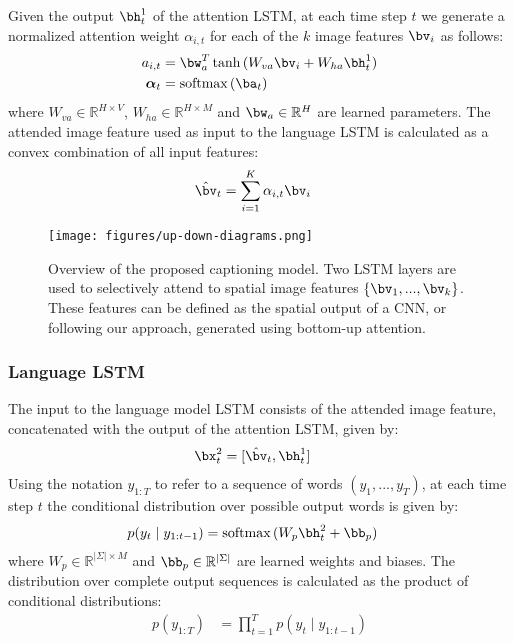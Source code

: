\documentclass[10pt,twocolumn,letterpaper]{article}
\begin{document}
Given the output $\bh_t^1$ of the attention LSTM, at each time step $t$ we generate a normalized attention weight $\alpha_{i,t}$ for each of the $k$ image features $\bv_i$ as follows:
\begin{align}
\label{eqn:att}
a_{i,t} &= \bw_a^T \tanh\,(W_{va}\bv_i + W_{ha}\bh_t^1) \\
\label{eqn:norm}
\boldsymbol{\alpha}_{t} &= \textrm{softmax}\,(\ba_{t})
\end{align}
\noindent
where $W_{va} \in \mathbb{R}^{H\times V}$, $W_{ha} \in \mathbb{R}^{H\times M}$ and $\bw_a \in \mathbb{R}^{H}$ are learned parameters. The attended image feature used as input to the language LSTM is calculated as a convex combination of all input features:
\begin{align}
\label{eqn:attended}
\hat{\bv}_t &= \sum_{i=1}^{K}{\alpha_{i,t}\bv_i}
\end{align}
\begin{figure}[t]
	\begin{center}
		\texttt{[image: figures/up-down-diagrams.png]}
	\end{center}
	\caption{Overview of the proposed captioning model. Two LSTM layers are used to selectively attend to spatial image features $\{\bv_1,...,\bv_k\}$. These features can be defined as the spatial output of a CNN, or following our approach, generated using bottom-up attention.}
	\label{fig:captioner}
\end{figure}

\subsubsection{Language LSTM}

The input to the language model LSTM consists of the attended image feature, concatenated with the output of the attention LSTM, given by:
\begin{align}
\bx_t^2 &= [\hat{\bv}_t, \bh_{t}^1]
\end{align}
Using the notation $y_{1:T}$ to refer to a sequence of words $(y_1, ..., y_T)$, at each time step $t$ the conditional distribution over possible output words is given by:
\begin{align}
p(y_t \mid y_{1:t-1}) &= \textrm{softmax}\,(W_{p}\bh_{t}^2 + \bb_p)
\end{align}
\noindent
where $W_{p} \in \mathbb{R}^{\vert\Sigma\vert \times M}$ and $\bb_p \in \mathbb{R}^{\vert\Sigma\vert}$ are learned weights and biases. The distribution over complete output sequences is calculated as the product of conditional distributions:
\begin{align}
p(y_{1:T}) &= \prod_{t=1}^{T} p(y_t \mid y_{1:t-1})
\end{align}
\end{document}
